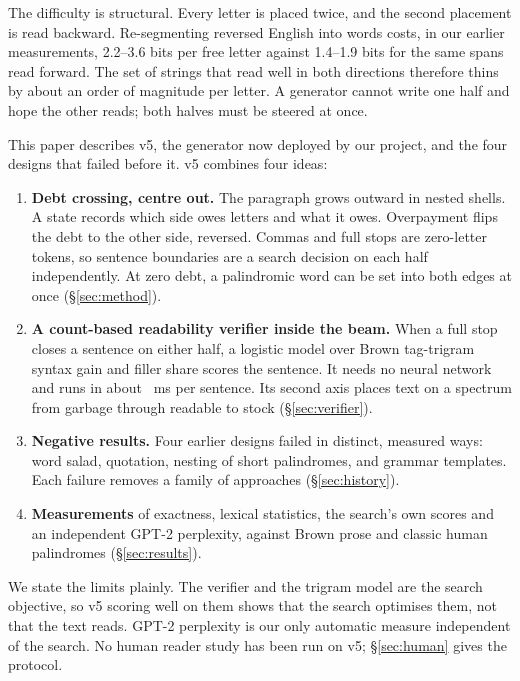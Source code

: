 \documentclass[11pt]{article}
\begin{document}
The difficulty is structural. Every letter is placed twice, and the second placement is read backward. Re-segmenting reversed English into words costs, in our earlier measurements, 2.2--3.6 bits per free letter against 1.4--1.9 bits for the same spans read forward. The set of strings that read well in both directions therefore thins by about an order of magnitude per letter. A generator cannot write one half and hope the other reads; both halves must be steered at once.

This paper describes v5, the generator now deployed by our project, and the four designs that failed before it. v5 combines four ideas:

\begin{enumerate}
\item \textbf{Debt crossing, centre out.} The paragraph grows outward in nested shells. A state records which side owes letters and what it owes. Overpayment flips the debt to the other side, reversed. Commas and full stops are zero-letter tokens, so sentence boundaries are a search decision on each half independently. At zero debt, a palindromic word can be set into both edges at once (\S\ref{sec:method}).
\item \textbf{A count-based readability verifier inside the beam.} When a full stop closes a sentence on either half, a logistic model over Brown tag-trigram syntax gain and filler share scores the sentence. It needs no neural network and runs in about \verifierMs{}~ms per sentence. Its second axis places text on a spectrum from garbage through readable to stock (\S\ref{sec:verifier}).
\item \textbf{Negative results.} Four earlier designs failed in distinct, measured ways: word salad, quotation, nesting of short palindromes, and grammar templates. Each failure removes a family of approaches (\S\ref{sec:history}).
\item \textbf{Measurements} of exactness, lexical statistics, the search's own scores and an independent GPT-2 perplexity, against Brown prose and classic human palindromes (\S\ref{sec:results}).
\end{enumerate}

We state the limits plainly. The verifier and the trigram model are the search objective, so v5 scoring well on them shows that the search optimises them, not that the text reads. GPT-2 perplexity is our only automatic measure independent of the search. No human reader study has been run on v5; \S\ref{sec:human} gives the protocol.
\end{document}
